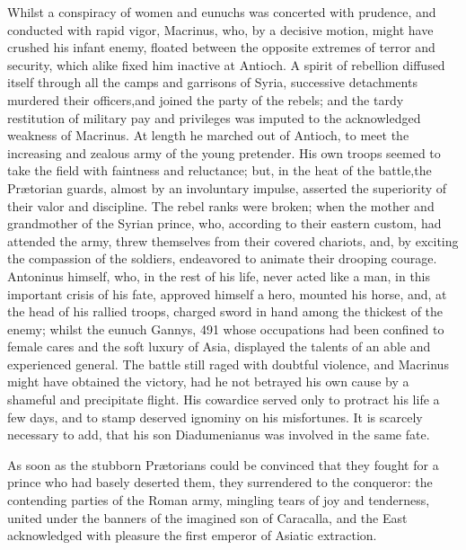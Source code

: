Whilst a conspiracy of women and eunuchs was concerted with
prudence, and conducted with rapid vigor, Macrinus, who, by a
decisive motion, might have crushed his infant enemy, floated
between the opposite extremes of terror and security, which alike
fixed him inactive at Antioch. A spirit of rebellion diffused
itself through all the camps and garrisons of Syria, successive
detachments murdered their officers,\footnotemark[48] and joined the party of
the rebels; and the tardy restitution of military pay and
privileges was imputed to the acknowledged weakness of Macrinus.
At length he marched out of Antioch, to meet the increasing and
zealous army of the young pretender. His own troops seemed to
take the field with faintness and reluctance; but, in the heat of
the battle,\footnotemark[49] the Prætorian guards, almost by an involuntary
impulse, asserted the superiority of their valor and discipline.
The rebel ranks were broken; when the mother and grandmother of
the Syrian prince, who, according to their eastern custom, had
attended the army, threw themselves from their covered chariots,
and, by exciting the compassion of the soldiers, endeavored to
animate their drooping courage. Antoninus himself, who, in the
rest of his life, never acted like a man, in this important
crisis of his fate, approved himself a hero, mounted his horse,
and, at the head of his rallied troops, charged sword in hand
among the thickest of the enemy; whilst the eunuch Gannys, 491
whose occupations had been confined to female cares and the soft
luxury of Asia, displayed the talents of an able and experienced
general. The battle still raged with doubtful violence, and
Macrinus might have obtained the victory, had he not betrayed his
own cause by a shameful and precipitate flight. His cowardice
served only to protract his life a few days, and to stamp
deserved ignominy on his misfortunes. It is scarcely necessary to
add, that his son Diadumenianus was involved in the same fate.

As soon as the stubborn Prætorians could be convinced that they
fought for a prince who had basely deserted them, they
surrendered to the conqueror: the contending parties of the Roman
army, mingling tears of joy and tenderness, united under the
banners of the imagined son of Caracalla, and the East
acknowledged with pleasure the first emperor of Asiatic
extraction.


